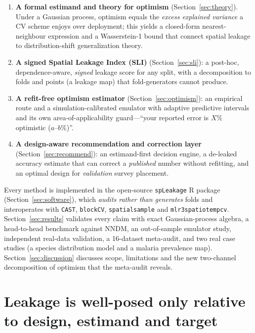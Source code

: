 \documentclass[11pt,a4paper]{article}
\begin{document}
\begin{enumerate}[leftmargin=1.4em,itemsep=2pt]
\item \textbf{A formal estimand and theory for optimism}
  (Section~\ref{sec:theory}). Under a Gaussian process, optimism equals the
  \emph{excess explained variance} a CV scheme enjoys over deployment; this yields a
  closed-form nearest-neighbour expression and a Wasserstein-1 bound that connect
  spatial leakage to distribution-shift generalization theory.
\item \textbf{A signed Spatial Leakage Index (SLI)}
  (Section~\ref{sec:sli}): a post-hoc, dependence-aware, \emph{signed} leakage score
  for any split, with a decomposition to folds and points (a leakage map) that
  fold-generators cannot produce.
\item \textbf{A refit-free optimism estimator}
  (Section~\ref{sec:optimism}): an empirical route and a simulation-calibrated
  emulator with adaptive predictive intervals and its own area-of-applicability
  guard---``your reported error is $X\%$ optimistic ($a$--$b\%$)''.
\item \textbf{A design-aware recommendation and correction layer}
  (Section~\ref{sec:recommend}): an estimand-first decision engine, a de-leaked
  accuracy estimate that can correct a \emph{published} number without refitting,
  and an optimal design for \emph{validation} survey placement.
\end{enumerate}

Every method is implemented in the open-source \texttt{spLeakage} R package
(Section~\ref{sec:software}), which \emph{audits rather than generates} folds and
interoperates with \texttt{CAST}, \texttt{blockCV}, \texttt{spatialsample} and
\texttt{mlr3spatiotempcv}. Section~\ref{sec:results} validates every claim with
exact Gaussian-process algebra, a head-to-head benchmark against NNDM, an
out-of-sample emulator study, independent real-data validation, a 16-dataset
meta-audit, and two real case studies (a species distribution model and a malaria
prevalence map). Section~\ref{sec:discussion} discusses scope,
limitations and the new two-channel decomposition of optimism that the meta-audit
reveals.

\section{Leakage is well-posed only relative to design, estimand and
target}\label{sec:thesis}
\end{document}
